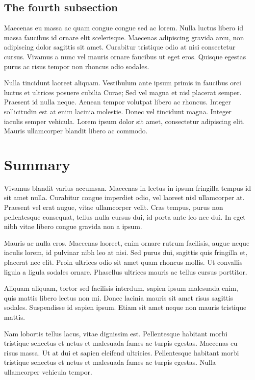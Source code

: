 \subsection{The fourth subsection}
\label{ch7:second:d}
Maecenas eu massa ac quam congue congue sed ac lorem. Nulla luctus libero id massa faucibus id ornare elit scelerisque. Maecenas adipiscing gravida arcu, non adipiscing dolor sagittis sit amet. Curabitur tristique odio at nisi consectetur cursus. Vivamus a nunc vel mauris ornare faucibus ut eget eros. Quisque egestas purus ac risus tempor non rhoncus odio sodales. 

Nulla tincidunt laoreet aliquam. Vestibulum ante ipsum primis in faucibus orci luctus et ultrices posuere cubilia Curae; Sed vel magna et nisl placerat semper. Praesent id nulla neque. Aenean tempor volutpat libero ac rhoncus. Integer sollicitudin est at enim lacinia molestie. Donec vel tincidunt magna. Integer iaculis semper vehicula. Lorem ipsum dolor sit amet, consectetur adipiscing elit. Mauris ullamcorper blandit libero ac commodo.


\section{Summary}
\label{ch7:summary}
Vivamus blandit varius accumsan. Maecenas in lectus in ipsum fringilla tempus id sit amet nulla. Curabitur congue imperdiet odio, vel laoreet nisl ullamcorper at. Praesent vel erat augue, vitae ullamcorper velit. Cras tempus, purus non pellentesque consequat, tellus nulla cursus dui, id porta ante leo nec dui. In eget nibh vitae libero congue gravida non a ipsum. 

Mauris ac nulla eros. Maecenas laoreet, enim ornare rutrum facilisis, augue neque iaculis lorem, id pulvinar nibh leo at nisi. Sed purus dui, sagittis quis fringilla et, placerat nec elit. Proin ultrices odio sit amet quam rhoncus mollis. Ut convallis ligula a ligula sodales ornare. Phasellus ultrices mauris ac tellus cursus porttitor. 

Aliquam aliquam, tortor sed facilisis interdum, sapien ipsum malesuada enim, quis mattis libero lectus non mi. Donec lacinia mauris sit amet risus sagittis sodales. Suspendisse id sapien ipsum. Etiam sit amet neque non mauris tristique mattis.

Nam lobortis tellus lacus, vitae dignissim est. Pellentesque habitant morbi tristique senectus et netus et malesuada fames ac turpis egestas. Maecenas eu risus massa. Ut at dui et sapien eleifend ultricies. Pellentesque habitant morbi tristique senectus et netus et malesuada fames ac turpis egestas. Nulla ullamcorper vehicula tempor. 

